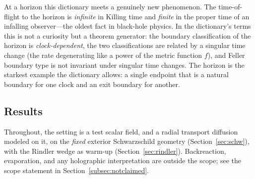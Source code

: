 \documentclass[11pt]{article}
\theoremstyle{definition}
\theoremstyle{remark}
\begin{document}
At a horizon this dictionary meets a genuinely new phenomenon. The
time-of-flight to the horizon is \emph{infinite} in Killing time and
\emph{finite} in the proper time of an infalling observer---the oldest
fact in black-hole physics. In the dictionary's terms this is not a
curiosity but a theorem generator: the boundary classification of the
horizon is \emph{clock-dependent}, the two classifications are related
by a singular time change (the rate degenerating like a power of the
metric function $f$), and
Feller boundary type is not invariant under singular time changes. The
horizon is the starkest example the dictionary allows: a
single endpoint that is a natural boundary for one clock and an exit
boundary for another.

\subsection{Results}

Throughout, the setting is a test scalar field, and a radial transport
diffusion modeled on it, on the \emph{fixed} exterior Schwarzschild
geometry (Section~\ref{sec:schw}), with the Rindler wedge as warm-up
(Section~\ref{sec:rindler}). Backreaction, evaporation, and any
holographic interpretation are outside the scope; see the scope
statement in Section~\ref{subsec:notclaimed}.
\end{document}
